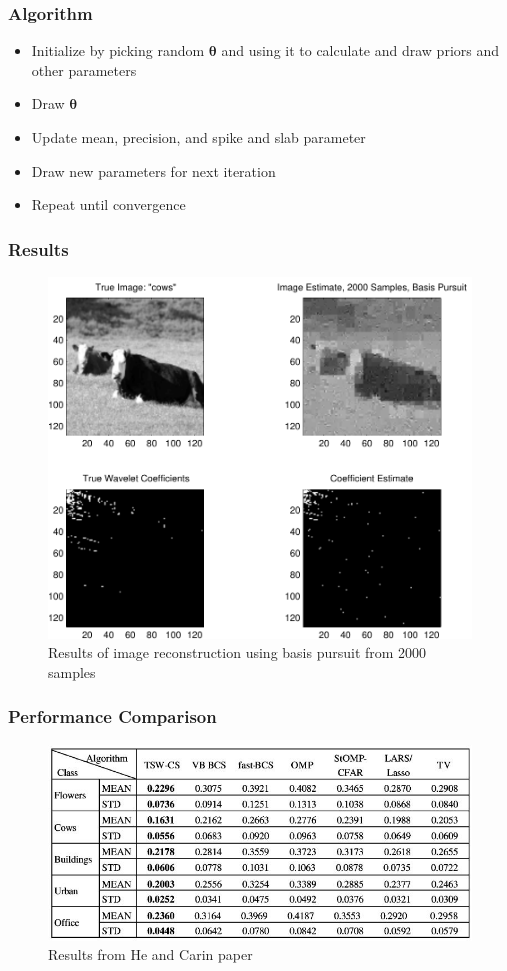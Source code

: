 \documentclass{beamer}
\newcommand{\bftheta}{\mathbf{\theta}}
\begin{document}
\begin{frame}
  \frametitle{Algorithm}
  \begin{itemize}
  \item Initialize by picking random $\bftheta$ and using it to
    calculate and draw priors and other parameters
  \item Draw $\bftheta$
  \item Update mean, precision, and spike and slab parameter
  \item Draw new parameters for next iteration
  \item Repeat until convergence
  \end{itemize}
\end{frame}

\begin{frame}
  \frametitle{Results}
\vspace{-1cm}
 \begin{figure}
    \centering
    \includegraphics[width=.65\linewidth]{cows_m2000_cvx}
    \caption{Results of image reconstruction using basis pursuit from 2000 samples}
 \end{figure}
\end{frame}

\begin{frame}
  \frametitle{Performance Comparison}
 \begin{figure}
    \centering
    \includegraphics[width=.65\linewidth]{he_carin_results_m2000}
    \caption{Results from He and Carin paper}
 \end{figure}
\end{frame}
\end{document}
